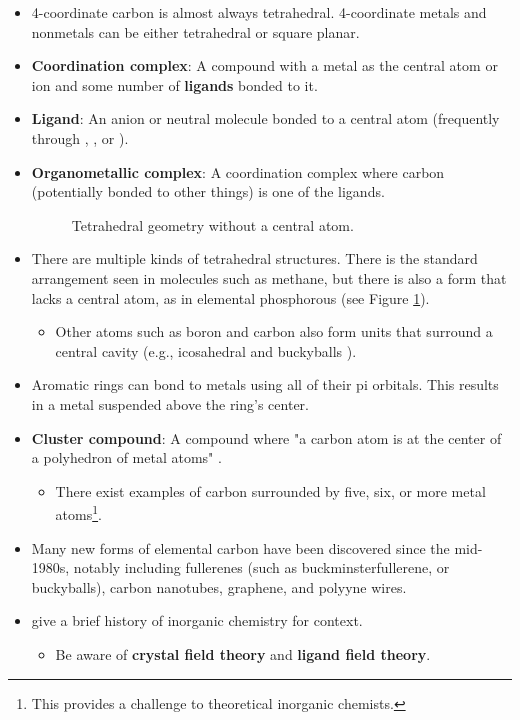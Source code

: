 \documentclass[../notes.tex]{subfiles}
\begin{document}
\begin{itemize}
\begin{itemize}
    \end{itemize}
    \item 4-coordinate carbon is almost always tetrahedral. 4-coordinate metals and nonmetals can be either tetrahedral or square planar.
    \item \textbf{Coordination complex}: A compound with a metal as the central atom or ion and some number of \textbf{ligands} bonded to it.
    \item \textbf{Ligand}: An anion or neutral molecule bonded to a central atom (frequently through , , or ).
    \item \textbf{Organometallic complex}: A coordination complex where carbon (potentially bonded to other things) is one of the ligands.
    \begin{figure}[h!]
        \centering
        \footnotesize
        \caption{Tetrahedral geometry without a central atom.}
        \label{fig:tetrahedralNoCentral}
    \end{figure}
    \item There are multiple kinds of tetrahedral structures. There is the standard arrangement seen in molecules such as methane, but there is also a form that lacks a central atom, as in elemental phosphorous  (see Figure \ref{fig:tetrahedralNoCentral}).
    \begin{itemize}
        \item Other atoms such as boron and carbon also form units that surround a central cavity (e.g., icosahedral  and buckyballs ).
    \end{itemize}
    \item Aromatic rings can bond to metals using all of their pi orbitals. This results in a metal suspended above the ring's center.
    \item \textbf{Cluster compound}: A compound where "a carbon atom is at the center of a polyhedron of metal atoms" \parencite[3]{bib:MiesslerFischerTarr}.
    \begin{itemize}
        \item There exist examples of carbon surrounded by five, six, or more metal atoms\footnote{This provides a challenge to theoretical inorganic chemists.}.
    \end{itemize}
    \item Many new forms of elemental carbon have been discovered since the mid-1980s, notably including fullerenes (such as buckminsterfullerene, or buckyballs), carbon nanotubes, graphene, and polyyne wires.
    \item \textcite{bib:MiesslerFischerTarr} give a brief history of inorganic chemistry for context.
    \begin{itemize}
        \item Be aware of \textbf{crystal field theory} and \textbf{ligand field theory}.
    \end{itemize}
\end{itemize}
\newpage
\end{document}
